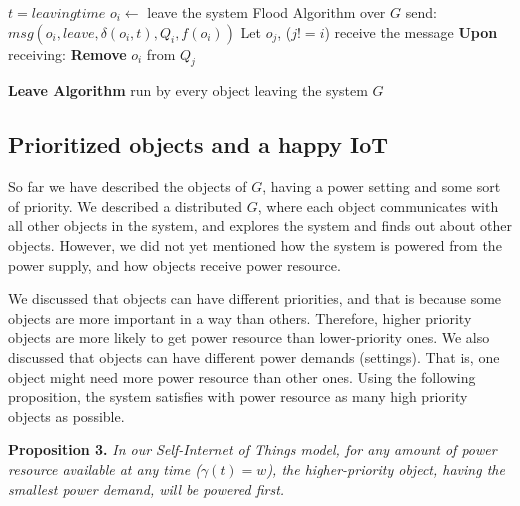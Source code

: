 \documentclass[../main/Self-Stabilization.tex]{subfiles}
\begin{document}
\LinesNumbered
\IncMargin{1em}
\begin{algorithm}
$t = leaving time$ 
\BlankLine
$o_{i} \gets$ leave the system \newline
Flood Algorithm over $G$ \newline
send: $msg(o_{i}, leave,\delta(o_{i}, t), Q_{i}, f(o_{i}))$
\BlankLine
{} {
    Let $o_{j}$, ($j!=i$) receive the message 
    \BlankLine
    \textbf{Upon} receiving:\newline
     {
          \textbf{Remove} $o_{i}$ from $Q_{j}$
          \BlankLine
    }
}
\caption{\textbf{Leave Algorithm} run by every object leaving the system $G$} \label{algo2}
\end{algorithm}
\DecMargin{1em}

\subsection{Prioritized objects and a happy IoT}

So far we have described the objects of $G$, having a power setting and some sort of priority. We described a distributed $G$, where each object communicates with all other objects in the system, and explores the system and finds out about other objects. However, we did not yet mentioned how the system is powered from the power supply, and how objects receive power resource.

We discussed that objects can have different priorities, and that is because some objects are more important in a way than others. Therefore, higher priority objects are more likely to get power resource than lower-priority ones. We also discussed that objects can have different power demands (settings). That is, one object might need more power resource than other ones. Using the following proposition, the system satisfies with power resource as many high priority objects as possible.

\textbf{Proposition 3.} \emph{In our Self-Internet of Things model, for any amount of power resource available at any time ($\gamma(t)= w$), the higher-priority object, having the smallest power demand, will be powered first.}
\end{document}
